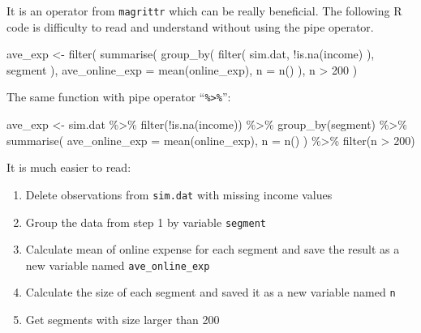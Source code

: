 \documentclass[
  12pt,
]{krantz}
\makeatletter
\newenvironment{Shaded}{\begin{snugshade}}{\end{snugshade}}
\newcommand{\AttributeTok}[1]{\textcolor[rgb]{0.61,0.61,0.61}{#1}}
\newcommand{\DecValTok}[1]{\textcolor[rgb]{0.06,0.06,0.06}{#1}}
\newcommand{\FunctionTok}[1]{\textcolor[rgb]{0,0,0}{#1}}
\newcommand{\NormalTok}[1]{#1}
\newcommand{\OtherTok}[1]{\textcolor[rgb]{0.37,0.37,0.37}{#1}}
\newcommand{\SpecialCharTok}[1]{\textcolor[rgb]{0,0,0}{#1}}
\providecommand{\tightlist}{%
  \setlength{\itemsep}{0pt}\setlength{\parskip}{0pt}}
\newenvironment{kframe}{%
\medskip{}
\setlength{\fboxsep}{.8em}
 \def\at@end@of@kframe{}%
 \ifinner\ifhmode%
  \def\at@end@of@kframe{\end{minipage}}%
  \begin{minipage}{\columnwidth}%
 \fi\fi%
 \def\FrameCommand##1{\hskip\@totalleftmargin \hskip-\fboxsep
 \colorbox{shadecolor}{##1}\hskip-\fboxsep
     \hskip-\linewidth \hskip-\@totalleftmargin \hskip\columnwidth}%
 \MakeFramed {\advance\hsize-\width
   \@totalleftmargin\z@ \linewidth\hsize
   \@setminipage}}%
 {\par\unskip\endMakeFramed%
 \at@end@of@kframe}
\renewenvironment{Shaded}{\begin{kframe}}{\end{kframe}}
\makeatother
\begin{document}
It is an operator from \texttt{magrittr} which can be really beneficial. The following R code is difficulty to read and understand without using the pipe operator.

\begin{Shaded}
\begin{Highlighting}[]
\NormalTok{ave\_exp }\OtherTok{\textless{}{-}} \FunctionTok{filter}\NormalTok{( }
  \FunctionTok{summarise}\NormalTok{(}
    \FunctionTok{group\_by}\NormalTok{( }
      \FunctionTok{filter}\NormalTok{(}
\NormalTok{        sim.dat, }
        \SpecialCharTok{!}\FunctionTok{is.na}\NormalTok{(income)}
\NormalTok{      ), }
\NormalTok{      segment}
\NormalTok{    ), }
    \AttributeTok{ave\_online\_exp =} \FunctionTok{mean}\NormalTok{(online\_exp), }
    \AttributeTok{n =} \FunctionTok{n}\NormalTok{()}
\NormalTok{  ), }
\NormalTok{  n }\SpecialCharTok{\textgreater{}} \DecValTok{200}
\NormalTok{) }
\end{Highlighting}
\end{Shaded}

The same function with pipe operator ``\texttt{\%\textgreater{}\%}'':

\begin{Shaded}
\begin{Highlighting}[]
\NormalTok{ave\_exp }\OtherTok{\textless{}{-}}\NormalTok{ sim.dat }\SpecialCharTok{\%\textgreater{}\%} 
 \FunctionTok{filter}\NormalTok{(}\SpecialCharTok{!}\FunctionTok{is.na}\NormalTok{(income)) }\SpecialCharTok{\%\textgreater{}\%} 
 \FunctionTok{group\_by}\NormalTok{(segment) }\SpecialCharTok{\%\textgreater{}\%} 
 \FunctionTok{summarise}\NormalTok{( }
   \AttributeTok{ave\_online\_exp =} \FunctionTok{mean}\NormalTok{(online\_exp), }
   \AttributeTok{n =} \FunctionTok{n}\NormalTok{() ) }\SpecialCharTok{\%\textgreater{}\%} 
  \FunctionTok{filter}\NormalTok{(n }\SpecialCharTok{\textgreater{}} \DecValTok{200}\NormalTok{)}
\end{Highlighting}
\end{Shaded}

It is much easier to read:

\begin{enumerate}
\def\labelenumi{\arabic{enumi}.}
\tightlist
\item
  Delete observations from \texttt{sim.dat} with missing income values
\item
  Group the data from step 1 by variable \texttt{segment}
\item
  Calculate mean of online expense for each segment and save the result as a new variable named \texttt{ave\_online\_exp}
\item
  Calculate the size of each segment and saved it as a new variable named \texttt{n}
\item
  Get segments with size larger than 200
\end{enumerate}
\end{document}
